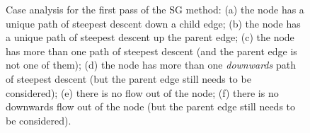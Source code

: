 \documentclass[review,a4paper]{elsarticle}
\newenvironment{stusubfig}[1]
{
	\begin{figure}[#1]
	\begin{center}
}
{
	\end{center}
	\end{figure}
}
\begin{document}
\begin{stusubfig}{!t}
	\hspace{4mm}%
\caption{Case analysis for the first pass of the SG method: (a) the node has a unique path of steepest descent down a child edge; (b) the node has a unique path of steepest descent up the parent edge; (c) the node has more than one path of steepest descent (and the parent edge is not one of them); (d) the node has more than one \emph{downwards} path of steepest descent (but the parent edge still needs to be considered); (e) there is no flow out of the node; (f) there is no downwards flow out of the node (but the parent edge still needs to be considered).}
\label{fig:segmentation-waterfall-smg-pass1cases}
\end{stusubfig}
\end{document}

